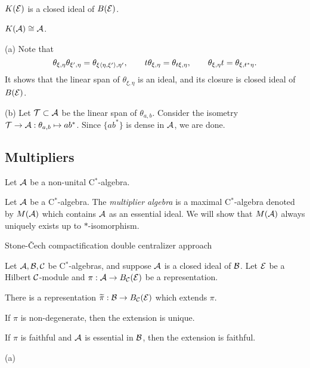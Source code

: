 \documentclass{../../../small}
\begin{document}
\begin{prop}\,
\begin{parts}
\item $K(\mathcal{E})$ is a closed ideal of $B(\mathcal{E})$.
\item $K(\mathcal{A})\cong\mathcal{A}$.
\end{parts}
\end{prop}
\begin{pf}
(a)
Note that
\[\theta_{\xi,\eta}\theta_{\xi',\eta}=\theta_{\xi\langle\eta,\xi'\rangle,\eta'},\qquad t\theta_{\xi,\eta}=\theta_{t\xi,\eta},\qquad\theta_{\xi,\eta}t=\theta_{\xi,t^*\eta}.\]
It shows that the linear span of $\theta_{\xi,\eta}$ is an ideal, and its closure is closed ideal of $B(\mathcal{E})$.

(b)
Let $\mathcal{T}\subset\mathcal{A}$ be the linear span of $\theta_{a,b}$. 
Consider the isometry $\mathcal{T}\to\mathcal{A}:\theta_{a,b}\mapsto ab^*$.
Since $\{ab^*\}$ is dense in $\mathcal{A}$, we are done.

\end{pf}









\subsection{Multipliers}

Let $\mathcal{A}$ be a non-unital C$^*$-algebra.

\begin{defn}
Let $\mathcal{A}$ be a C$^*$-algebra.
The \emph{multiplier algebra} is a maximal C$^*$-algebra denoted by $M(\mathcal{A})$ which contains $\mathcal{A}$ as an essential ideal.
We will show that $M(\mathcal{A})$ always uniquely exists up to $*$-isomorphism.
\end{defn}

Stone-\v Cech compactification
double centralizer approach


\begin{prop}
Let $\mathcal{A},\mathcal{B},\mathcal{C}$ be C$^*$-algebras, and suppose $\mathcal{A}$ is a closed ideal of $\mathcal{B}$.
Let $\mathcal{E}$ be a Hilbert $\mathcal{C}$-module and $\pi:\mathcal{A}\to B_{\mathcal{C}}(\mathcal{E})$ be a representation.
\begin{parts}
\item
There is a representation $\widetilde\pi:\mathcal{B}\to B_{\mathcal{C}}(\mathcal{E})$ which extends $\pi$.
\item If $\pi$ is non-degenerate, then the extension is unique.
\item If $\pi$ is faithful and $\mathcal{A}$ is essential in $\mathcal{B}$, then the extension is faithful.
\end{parts}
\end{prop}
\begin{pf}
(a)

\end{pf}
\end{document}
